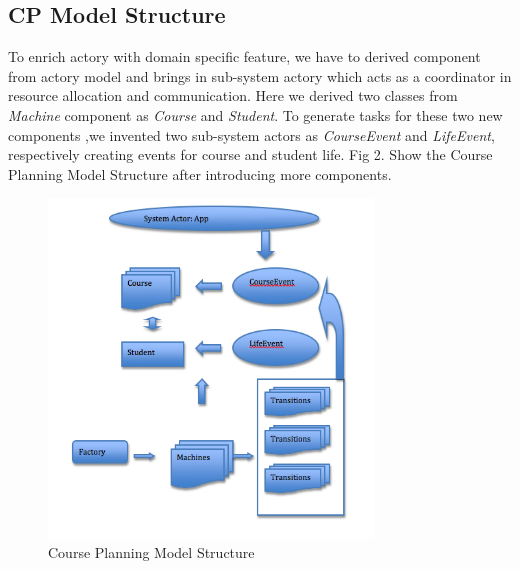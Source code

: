 \documentclass{sig-alternate}
\begin{document}
\subsection{CP Model Structure}
To enrich actory with domain specific feature, we have to derived component from actory model and brings in sub-system actory which acts as a coordinator in resource allocation and communication. Here we derived two classes from {\em Machine} component as {\em Course} and {\em Student}.    To generate tasks for these two new components ,we invented two sub-system actors as {\em CourseEvent} and {\em LifeEvent}, respectively creating events for course and student life.  Fig 2. Show the Course Planning Model Structure after introducing more components.\\
\begin{figure}[!h]
\centering
\includegraphics[height=90mm ]{courseplanmodel.png}
\caption{Course Planning Model Structure}
\end{figure}
\end{document}
